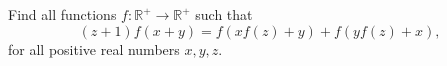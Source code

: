 Find all functions $f: \mathbb{R}^+ \to \mathbb{R}^+$ such that \[(z + 1)f(x + y) = f(xf(z) + y) + f(yf(z) + x),\] for all positive real numbers $x, y, z$.